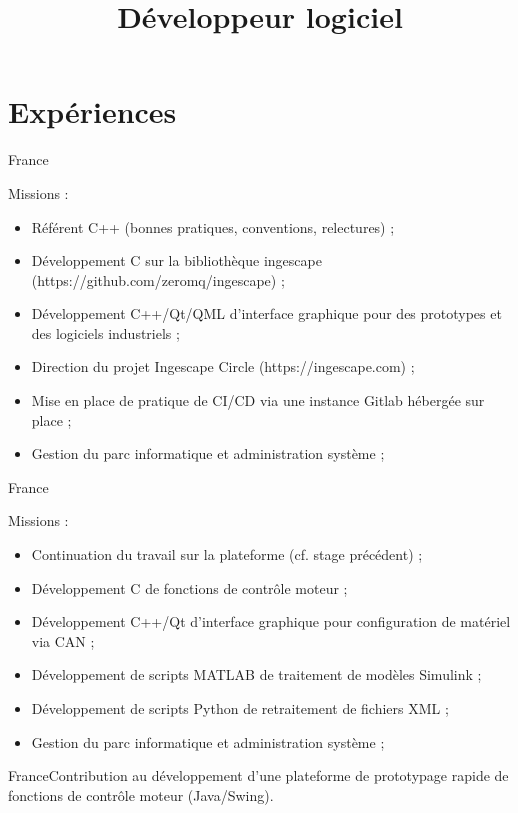 \documentclass[10pt,a4paper]{moderncv}
\title{Développeur logiciel}
\begin{document}
\maketitle
\thispagestyle{empty}
\section{Expériences}
{France}{Missions :
\begin{itemize}
  \item{Référent C++ (bonnes pratiques, conventions, relectures) ;}
  \item{Développement C sur la bibliothèque ingescape (https://github.com/zeromq/ingescape) ;}
  \item{Développement C++/Qt/QML d'interface graphique pour des prototypes et des logiciels industriels ;}
  \item{Direction du projet Ingescape Circle (https://ingescape.com) ;}
  \item{Mise en place de pratique de CI/CD via une instance Gitlab hébergée sur place ;}
  \item{Gestion du parc informatique et administration système ;}
\end{itemize}}
{France}{Missions :
\begin{itemize}
  \item{Continuation du travail sur la plateforme (cf. stage précédent) ;}
  \item{Développement C de fonctions de contrôle moteur ;}
  \item{Développement C++/Qt d'interface graphique pour configuration de matériel via CAN ;}
  \item{Développement de scripts MATLAB de traitement de modèles Simulink ;}
  \item{Développement de scripts Python de retraitement de fichiers XML ;}
  \item{Gestion du parc informatique et administration système ;}
\end{itemize}}
{France}{Contribution au développement d'une plateforme de prototypage rapide de fonctions
de contrôle moteur (Java/Swing).}
\end{document}
